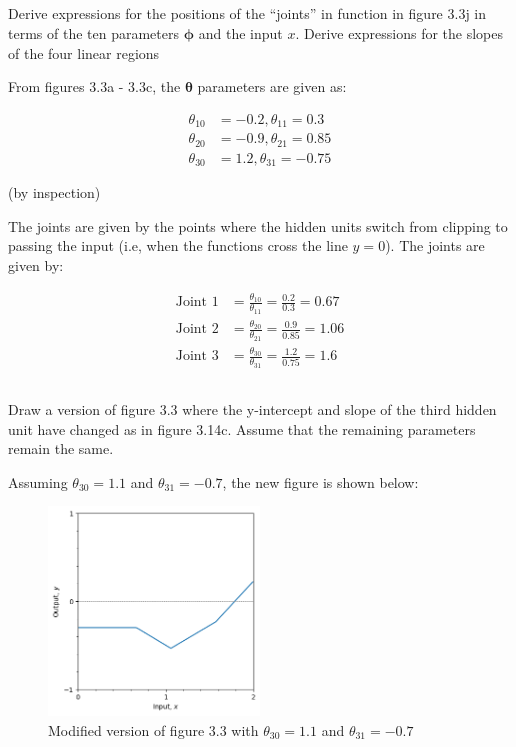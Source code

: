 \documentclass[12pt]{report}
\begin{document}
\subsection{}
\begin{mdframed}
    Derive expressions for the positions of the “joints” in function in figure 3.3j in terms of the ten parameters $\boldsymbol{\phi}$ and the input $x$. Derive expressions for the slopes of the four linear regions
\end{mdframed}

From figures 3.3a - 3.3c, the $\boldsymbol{\theta}$ parameters are given as:

\begin{align*}
    \theta_{10} & = -0.2, \theta_{11} = 0.3  \\
    \theta_{20} & = -0.9, \theta_{21} = 0.85 \\
    \theta_{30} & = 1.2, \theta_{31} = -0.75
\end{align*}

(by inspection)

The joints are given by the points where the hidden units switch from clipping to passing the input (i.e, when the functions cross the line $y=0$). The joints are given by:

\begin{align*}
    \text{Joint 1} & = \frac{\theta_{10}}{\theta_{11}} = \frac{0.2}{0.3} = 0.67  \\
    \text{Joint 2} & = \frac{\theta_{20}}{\theta_{21}} = \frac{0.9}{0.85} = 1.06 \\
    \text{Joint 3} & = \frac{\theta_{30}}{\theta_{31}} = \frac{1.2}{0.75} = 1.6
\end{align*}

\subsection{}
\begin{mdframed}
    Draw a version of figure 3.3 where the y-intercept and slope of the third hidden unit have changed as in figure 3.14c. Assume that the remaining parameters remain the same.
\end{mdframed}

Assuming $\theta_{30} = 1.1$ and $\theta_{31} = -0.7$, the new figure is shown below:

\begin{figure}[h]
    \centering
    \includegraphics[width=0.5\textwidth]{plot3_4.png}
    \caption{Modified version of figure 3.3 with $\theta_{30} = 1.1$ and $\theta_{31} = -0.7$}
\end{figure}
\end{document}
